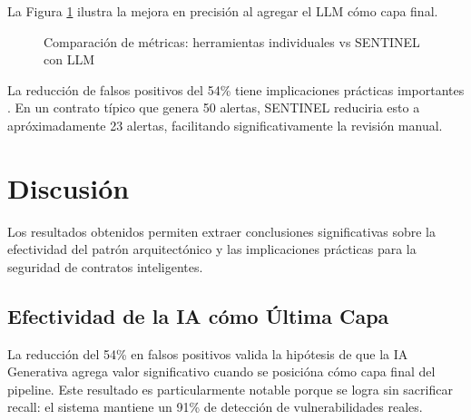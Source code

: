 \documentclass[12pt,a4paper,twoside]{book}
\begin{document}
La Figura \ref{fig:sentinel_precisión} ilustra la mejora en precisión al agregar el LLM cómo capa final.

\begin{figure}[h]
\centering
{}
\caption{Comparación de métricas: herramientas individuales vs SENTINEL con LLM}
\label{fig:sentinel_precisión}
\end{figure}

La reducción de falsos positivos del 54\% tiene implicaciones prácticas importantes \cite{powers2011evaluation}. En un contrato típico que genera 50 alertas, SENTINEL reduciria esto a apróximadamente 23 alertas, facilitando significativamente la revisión manual.

\section{Discusión}

Los resultados obtenidos permiten extraer conclusiones significativas sobre la efectividad del patrón arquitectónico y las implicaciones prácticas para la seguridad de contratos inteligentes.

\subsection{Efectividad de la IA cómo Última Capa}

La reducción del 54\% en falsos positivos valida la hipótesis de que la IA Generativa agrega valor significativo cuando se posicióna cómo capa final del pipeline. Este resultado es particularmente notable porque se logra sin sacrificar recall: el sistema mantiene un 91\% de detección de vulnerabilidades reales.
\end{document}
